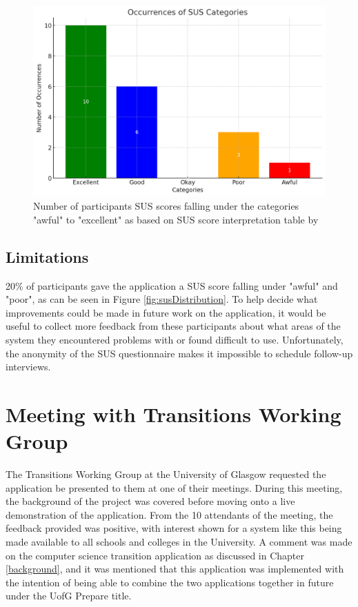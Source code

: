 \documentclass{l4proj}
\begin{document}
\begin{figure}[ht]
    \centering
    \includegraphics[width=0.7\linewidth]{images/susOccurences.pdf}    

    \caption{Number of participants SUS scores falling under the categories "awful" to "excellent" as based on SUS score interpretation table by \cite{T_2021}
    }

    \label{fig:susOccurences} 
\end{figure}

\subsection{Limitations}
20\% of participants gave the application a SUS score falling under "awful" and "poor",  as can be seen in Figure \ref{fig:susDistribution}. To help decide what improvements could be made in future work on the application,  it would be useful to collect more feedback from these participants about what areas of the system they encountered problems with or found difficult to use. Unfortunately,  the anonymity of the SUS questionnaire makes it impossible to schedule follow-up interviews.

\section{Meeting with Transitions Working Group} \label{TWG}
The Transitions Working Group at the University of Glasgow requested the application be presented to them at one of their meetings. During this meeting,  the background of the project was covered before moving onto a live demonstration of the application. From the 10 attendants of the meeting,  the feedback provided was positive,  with interest shown for a system like this being made available to all schools and colleges in the University. A comment was made on the computer science transition application as discussed in Chapter \ref{background},  and it was mentioned that this application was implemented with the intention of being able to combine the two applications together in future under the UofG Prepare title.
\end{document}
